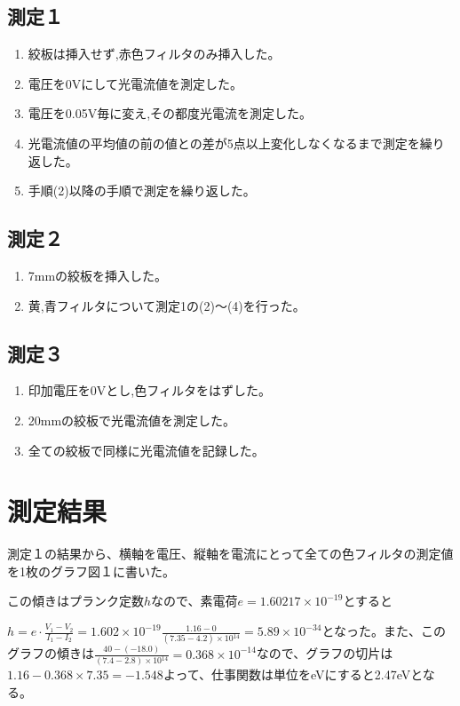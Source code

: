 \documentclass{jsarticle}
\begin{document}
\subsection{測定１}
\begin{enumerate}
\item 絞板は挿入せず,赤色フィルタのみ挿入した。
\item 電圧を0Vにして光電流値を測定した。
\item 電圧を0.05V毎に変え,その都度光電流を測定した。
\item 光電流値の平均値の前の値との差が5点以上変化しなくなるまで測定を繰り返した。
\item 手順(2)以降の手順で測定を繰り返した。
\end{enumerate}
\subsection{測定２}
\begin{enumerate}
\item 7mmの絞板を挿入した。
\item 黄,青フィルタについて測定1の(2)～(4)を行った。
\end{enumerate}
\subsection{測定３}
\begin{enumerate}
\item 印加電圧を0Vとし,色フィルタをはずした。
\item 20mmの絞板で光電流値を測定した。
\item 全ての絞板で同様に光電流値を記録した。
\end{enumerate}


\section{測定結果}

測定１の結果から、横軸を電圧、縦軸を電流にとって全ての色フィルタの測定値を1枚のグラフ図１に書いた。

この傾きはプランク定数$h$なので、素電荷$e = 1.60217 \times 10^{-19}$とすると\\
\par $h = e\cdot\frac{V_1-V_2}{I_1-I_2} = 1.602\times 10^{-19} \frac{1.16-0}{(7.35-4.2)\times 10{^14}} = 5.89\times 10^{-34}$となった。また、このグラフの傾きは$\frac{40-(-18.0)}{(7.4-2.8)\times 10{^14}} = 0.368\times 10^{-14}$なので、グラフの切片は$1.16 - 0.368\times 7.35 = -1.548$よって、仕事関数は単位をeVにすると2.47eVとなる。
\end{document}
